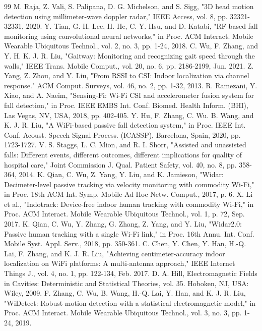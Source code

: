 \documentclass[journal]{IEEEtran}
\begin{document}
\begin{thebibliography}{99}
 M. Raja, Z. Vali, S. Palipana, D. G. Michelson, and S. Sigg, "3D head motion detection using millimeter-wave doppler radar," IEEE Access, vol. 8, pp. 32321-32331, 2020.
 Y. Tian, G.-H. Lee, H. He, C.-Y. Hsu, and D. Katabi, "RF-based fall monitoring using convolutional neural networks," in Proc. ACM Interact. Mobile Wearable Ubiquitous Technol., vol. 2, no. 3, pp. 1-24, 2018.
 C. Wu, F. Zhang, and Y. H. K. J. R. Liu, "Gaitway: Monitoring and recognizing gait speed through the walls," IEEE Trans. Mobile Comput., vol. 20, no. 6, pp. 2186-2199, Jun. 2021.
 Z. Yang, Z. Zhou, and Y. Liu, "From RSSI to CSI: Indoor localization via channel response." ACM Comput. Surveys, vol. 46, no. 2, pp. 1-32, 2013.
 R. Ramezani, Y. Xiao, and A. Naeim, "Sensing-Fi: Wi-Fi CSI and accelerometer fusion system for fall detection," in Proc. IEEE EMBS Int. Conf. Biomed. Health Inform. (BHI), Las Vegas, NV, USA, 2018, pp. 402-405.
 Y. Hu, F. Zhang, C. Wu. B. Wang, and K. J. R. Liu, "A WiFi-based passive fall detection system," in Proc. IEEE Int. Conf. Acoust. Speech Signal Process. (ICASSP), Barcelona, Spain, 2020, pp. 1723-1727.
 V. S. Staggs, L. C. Mion, and R. I. Shorr, "Assisted and unassisted falls: Different events, different outcomes, different implications for quality of hospital care," Joint Commission J. Qual. Patient Safety, vol. 40, no. 8, pp. 358-364, 2014.
 K. Qian, C. Wu, Z. Yang, Y. Liu, and K. Jamieson, "Widar: Decimeter-level passive tracking via velocity monitoring with commodity Wi-Fi," in Proc. 18th ACM Int. Symp. Mobile Ad Hoc Netw. Comput., 2017, p. 6.
 X. Li et al., "Indotrack: Device-free indoor human tracking with commodity Wi-Fi," in Proc. ACM Interact. Mobile Wearable Ubiquitous Technol., vol. 1, p. 72, Sep. 2017.
 K. Qian, C. Wu, Y. Zhang, G. Zhang, Z. Yang, and Y. Liu, "Widar2.0: Passive human tracking with a single Wi-Fi link," in Proc. 16th Annu. Int. Conf. Mobile Syst. Appl. Serv., 2018, pp. 350-361.
 C. Chen, Y. Chen, Y. Han, H.-Q. Lai, F. Zhang, and K. J. R. Liu, "Achieving centimeter-accuracy indoor localization on WiFi platforms: A multi-antenna approach," IEEE Internet Things J., vol. 4, no. 1, pp. 122-134, Feb. 2017.
 D. A. Hill, Electromagnetic Fields in Cavities: Deterministic and Statistical Theories, vol. 35. Hoboken, NJ, USA: Wiley, 2009.
 F. Zhang, C. Wu, B. Wang, H.-Q. Lai, Y. Han, and K. J. R. Liu, "WiDetect: Robust motion detection with a statistical electromagnetic model," in Proc. ACM Interact. Mobile Wearable Ubiquitous Technol., vol. 3, no. 3, pp. 1-24, 2019.

\end{thebibliography}
\end{document}
